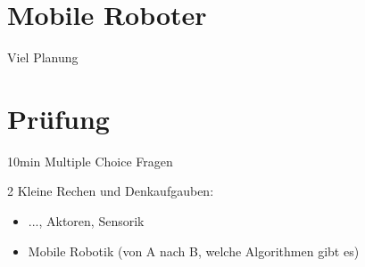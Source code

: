 \documentclass[a4paper]{article}
\title{\docTitle}
\author{Moritz}
\date{\today}
\begin{document}
\maketitle
\tableofcontents


\section{Mobile Roboter}


Viel Planung

\section{Prüfung}

10min Multiple Choice Fragen

2 Kleine Rechen und Denkaufgauben:

\begin{itemize}
    \item ..., Aktoren, Sensorik
    \item Mobile Robotik (von A nach B, welche Algorithmen gibt es)
\end{itemize}
\end{document}
